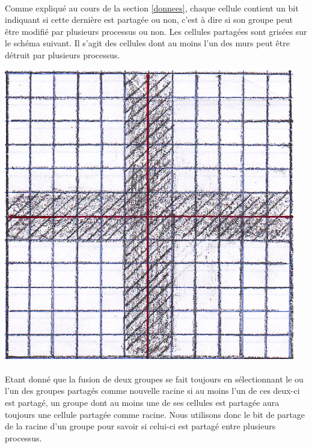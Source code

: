 \documentclass[a4paper,french]{article}
\begin{document}
    \paragraph{} Comme expliqué au cours de la section \ref{donnees}, chaque
cellule contient un bit indiquant si cette dernière est partagée ou non, c'est à
dire si son groupe peut être modifié par plusieurs processus ou non.
    \newline Les cellules partagées sont grisées sur le schéma suivant. Il 
s'agit des cellules dont au moins l'un des murs peut être détruit par plusieurs
processus.

    \begin{center}
        \includegraphics{schema_partages.eps}
    \end{center}

    \paragraph{} Etant donné que la fusion de deux groupes se fait toujours en
sélectionnant le ou l'un des groupes partagés comme nouvelle racine si au moins
l'un de ces deux-ci est partagé, un groupe dont au moins une de ses cellules
est partagée aura toujours une cellule partagée comme racine. Nous utilisons
donc le bit de partage de la racine d'un groupe pour savoir si celui-ci est
partagé entre plusieurs processus.
\end{document}
